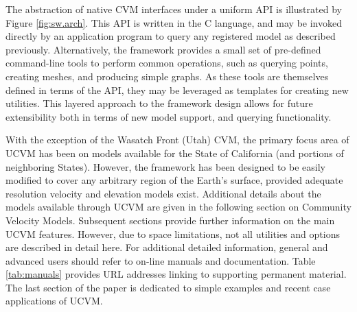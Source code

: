The abstraction of native CVM interfaces under a uniform API is illustrated by Figure \ref{fig:sw.arch}. This API is written in the C language, and may be invoked directly by an application program to query any registered model as described previously. Alternatively, the framework provides a small set of pre-defined command-line tools to perform common operations, such as querying points, creating meshes, and producing simple graphs. As these tools are themselves defined in terms of the API, they may be leveraged as templates for creating new utilities. This layered approach to the framework design allows for future extensibility both in terms of new model support, and querying functionality.

With the exception of the Wasatch Front (Utah) CVM, the primary focus area of UCVM has been on models available for the State of California (and portions of neighboring States). However, the framework has been designed to be easily modified to cover any arbitrary region of the Earth's surface, provided adequate resolution velocity and elevation models exist. Additional details about the models available through UCVM are given in the following section on Community Velocity Models. Subsequent sections provide further information on the main UCVM features. However, due to space limitations, not all utilities and options are described in detail here. For additional detailed information, general and advanced users should refer to on-line manuals and documentation. Table \ref{tab:manuals} provides URL addresses linking to supporting permanent material. The last section of the paper is dedicated to simple examples and recent case applications of UCVM. 

